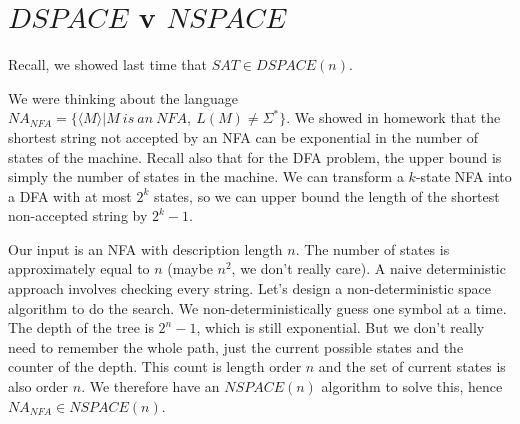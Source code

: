 




\section*{$DSPACE$ v $NSPACE$}

Recall, we showed last time that $SAT\in DSPACE(n)$.

We were thinking about the language $NA_{NFA}=\{ \langle M \rangle | M \ is \ an \ NFA, \ L(M)\neq \Sigma^*  \}$.  We showed in homework that the shortest string not accepted by an NFA can be exponential in the number of states of the machine.  Recall also that for the DFA problem, the upper bound is simply the number of states in the machine.  We can transform a $k$-state NFA into a DFA with at most $2^k$ states, so we can upper bound the length of the shortest non-accepted string by $2^k -1$.

Our input is an NFA with description length $n$.  The number of states is approximately equal to $n$ (maybe $n^2$, we don't really care).  A naive deterministic approach involves checking every string.  Let's design a non-deterministic space algorithm to do the search.  We non-deterministically guess one symbol at a time.  The depth of the tree is $2^n-1$, which is still exponential.  But we don't really need to remember the whole path, just the current possible states and the counter of the depth.  This count is length order $n$ and the set of current states is also order $n$.  We therefore have an $NSPACE(n)$ algorithm to solve this, hence $NA_{NFA}\in NSPACE(n)$.



